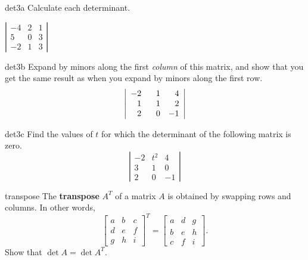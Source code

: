 \documentclass{watsonbook}
\begin{document}
\begin{exercise}{}{det3a} \setcounter{subitm}{1}
  Calculate each determinant. 

  {$\left|
      \begin{array}{ccc}
        -4 & 2 & 1 \\ 5 & 0 & 3 \\ -2 & 1 & 3
      \end{array}\right|$}
\end{exercise}

\begin{exercise}{}{det3b}
  Expand by minors along the first \textit{column} of this matrix, and
  show that you get the same result as when you expand by minors along
  the first row.
  \[
    \left|
      \begin{array}{ccc} -2 & \hphantom{-}1 & \hphantom{-}4 \\
        \hphantom{-}1 & \hphantom{-}1 & \hphantom{-}2 \\ \hphantom{-}2
                            & \hphantom{-}0 & -1
      \end{array}
    \right|
  \]
\end{exercise}

\begin{exercise}{}{det3c}
  Find the values of $t$ for which the determinant of the following matrix is zero.  
  \[
    \left|\begin{array}{ccc} -2 & t^2 & 4 \\  3 & 1 & 0 \\ 2 & 0  & -1 \end{array}\right|
  \]
\end{exercise}

\begin{exercise}{}{transpose}
  The \textbf{transpose} $A^T$ of a matrix $A$ is obtained by swapping rows and
  columns. In other words,
  \[
    \left[
      \begin{array}{ccc} a & b & c
        \\ d & e & f
        \\ g & h &i
      \end{array}
    \right]^T
    =
    \left[
      \begin{array}{ccc}
        a & d & g\\ b & e & h \\ c & f & i
      \end{array}
    \right]. 
  \]
  Show  that $\det A = \det A^T$. 
\end{exercise}
\end{document}
